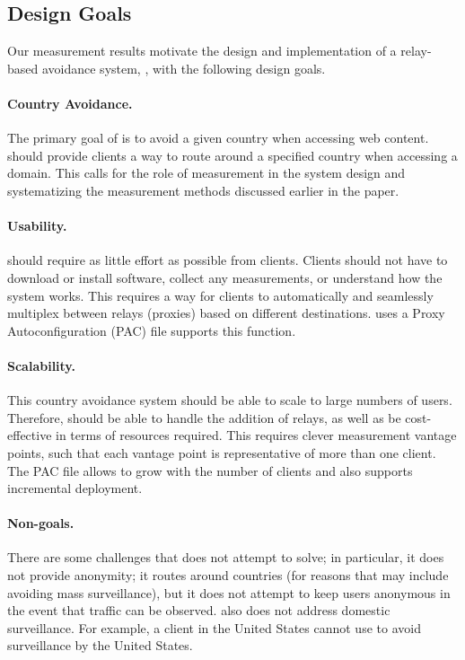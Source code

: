 \subsection{Design Goals}
\label{goals}

Our measurement results motivate 
 the design and implementation of a relay-based avoidance system,
\system{}, with the following design goals.

\paragraph{Country Avoidance.}  The primary goal of \system{} is to
avoid a given country when accessing web content.  \system{} should
provide clients a way to route around a specified country when
accessing a domain.  This calls for the role of measurement in the
system design and systematizing the measurement methods discussed
earlier in the paper.

\paragraph{Usability.} \system{} should require as little effort as
possible from clients.  Clients should not have to download
or install software, collect any measurements, or understand how the
system works.  This requires a way for clients to automatically and
seamlessly multiplex between relays (proxies) based on different
destinations.  \system{} uses a Proxy Autoconfiguration (PAC) file supports this
function.

\paragraph{Scalability.}  This country avoidance system should be able to scale to 
large numbers of users.  Therefore, \system{} should be able to handle the addition
 of relays, as well as be cost-effective in terms of resources required. This requires 
clever measurement vantage points, such that each vantage point is representative of 
more than one client.  The PAC file allows \system{} to 
grow with the number of clients and also supports incremental deployment.

\paragraph{Non-goals.}  There are some challenges that \system{} does not
attempt to  solve; in particular, it does not provide anonymity; it routes
around  countries (for reasons that may include avoiding mass surveillance),
but it does not attempt to keep users anonymous in the event that traffic can
be observed.   \system{} also does not address domestic surveillance. For
example, a client in the United States cannot use \system{} to avoid surveillance 
by the United States. 

